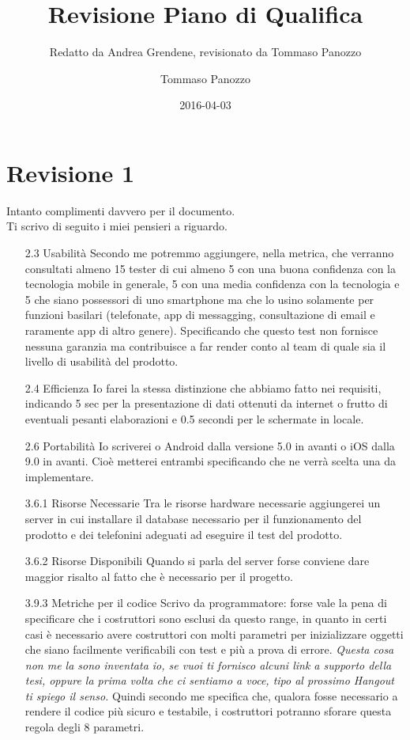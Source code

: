 \documentclass[11pt,a4paper]{article}
\author{Tommaso Panozzo}
\date{2016-04-03}
\title{Revisione Piano di Qualifica}
\subtitle{Redatto da Andrea Grendene, revisionato da Tommaso Panozzo}
\begin{document}
  \maketitle

  \section{Revisione 1}
  \label{sec:Revisione 1}

  Intanto complimenti davvero per il documento. \\
  Ti scrivo di seguito i miei pensieri a riguardo.
  \begin{itemize}
    \item [2.3 Usabilità] Secondo me potremmo aggiungere, nella metrica, che verranno consultati almeno 15 tester di cui almeno 5 con una buona confidenza con la tecnologia mobile in generale, 5 con una media confidenza con la tecnologia e 5 che siano possessori di uno smartphone ma che lo usino solamente per funzioni basilari (telefonate, app di messagging, consultazione di email e raramente app di altro genere). Specificando che questo test non fornisce nessuna garanzia ma contribuisce a far render conto al team di quale sia il livello di usabilità del prodotto.

    \item [2.4 Efficienza] Io farei la stessa distinzione che abbiamo fatto nei requisiti, indicando 5 sec per la presentazione di dati ottenuti da internet o frutto di eventuali pesanti elaborazioni e 0.5 secondi per le schermate in locale.

    \item [2.6 Portabilità] Io scriverei o Android dalla versione 5.0 in avanti o iOS dalla 9.0 in avanti. Cioè metterei entrambi specificando che ne verrà scelta una da implementare.

    \item [3.6.1 Risorse Necessarie] Tra le risorse hardware necessarie aggiungerei un server in cui installare il database necessario per il funzionamento del prodotto e dei telefonini adeguati ad eseguire il test del prodotto.

    \item [3.6.2 Risorse Disponibili] Quando si parla del server forse conviene dare maggior risalto al fatto che è necessario per il progetto.

    \item [3.9.3 Metriche per il codice] Scrivo da programmatore: forse vale la pena di specificare che i costruttori sono esclusi da questo range, in quanto in certi casi è necessario avere costruttori con molti parametri per inizializzare oggetti che siano facilmente verificabili con test e più a prova di errore. \textit{Questa cosa non me la sono inventata io, se vuoi ti fornisco alcuni link a supporto della tesi, oppure la prima volta che ci sentiamo a voce, tipo al prossimo Hangout ti spiego il senso.} Quindi secondo me specifica che, qualora fosse necessario a rendere il codice più sicuro e testabile, i costruttori potranno sforare questa regola degli 8 parametri.
  \end{itemize}
\end{document}

